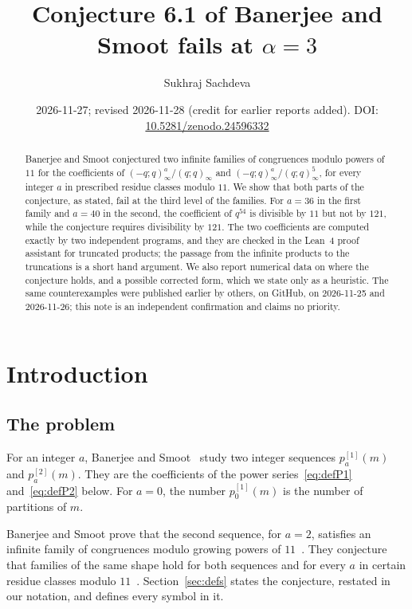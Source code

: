 \documentclass[11pt]{amsart}
\title[Banerjee--Smoot Conjecture 6.1 fails at \(\alpha=3\)]{Conjecture 6.1 of Banerjee and Smoot fails at \(\alpha=3\)}
\author{Sukhraj Sachdeva}
\date{2026-11-27; revised 2026-11-28 (credit for earlier reports added). DOI: \href{https://doi.org/10.5281/zenodo.24596332}{10.5281/zenodo.24596332}}
\theoremstyle{definition}
\theoremstyle{remark}
\newcommand{\pone}[1]{p^{[1]}_{#1}}
\newcommand{\ptwo}[1]{p^{[2]}_{#1}}
\begin{document}
\begin{abstract}
Banerjee and Smoot conjectured two infinite families of congruences modulo powers of \(11\) for the coefficients of \((-q;q)_\infty^a/(q;q)_\infty\) and \((-q;q)_\infty^a/(q;q)_\infty^5\), for every integer \(a\) in prescribed residue classes modulo \(11\). We show that both parts of the conjecture, as stated, fail at the third level of the families. For \(a=36\) in the first family and \(a=40\) in the second, the coefficient of \(q^{54}\) is divisible by \(11\) but not by \(121\), while the conjecture requires divisibility by \(121\). The two coefficients are computed exactly by two independent programs, and they are checked in the Lean~4 proof assistant for truncated products; the passage from the infinite products to the truncations is a short hand argument. We also report numerical data on where the conjecture holds, and a possible corrected form, which we state only as a heuristic. The same counterexamples were published earlier by others, on GitHub, on 2026-11-25 and 2026-11-26; this note is an independent confirmation and claims no priority.
\end{abstract}
\maketitle

\section{Introduction}\label{sec:intro}

\subsection*{The problem}
For an integer \(a\), Banerjee and Smoot~\cite{BS} study two integer sequences \(\pone{a}(m)\) and \(\ptwo{a}(m)\). They are the coefficients of the power series~\eqref{eq:defP1} and~\eqref{eq:defP2} below. For \(a=0\), the number \(\pone{0}(m)\) is the number of partitions of \(m\).

Banerjee and Smoot prove that the second sequence, for \(a=2\), satisfies an infinite family of congruences modulo growing powers of \(11\)~\cite[Thm.~1.1]{BS}. They conjecture that families of the same shape hold for both sequences and for every \(a\) in certain residue classes modulo \(11\)~\cite[Conj.~6.1]{BS}. Section~\ref{sec:defs} states the conjecture, restated in our notation, and defines every symbol in it.
\end{document}
